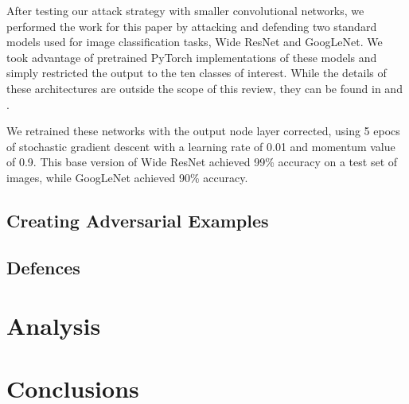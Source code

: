 \documentclass[conference]{IEEEtran}
\begin{document}
After testing our attack strategy with smaller convolutional networks, we
performed the work for this paper by attacking and defending two standard
models used for image classification tasks, Wide ResNet and GoogLeNet. We
took advantage of pretrained PyTorch implementations of these models and
simply restricted the output to the ten classes of interest. While the
details of these architectures are outside the scope of this review, they
can be found in \cite{zagoruyko2016wide} and \cite{szegedy2015going}.

We retrained these networks with the output node layer corrected, using 5
epocs of stochastic gradient descent with a learning rate of 0.01 and
momentum value of 0.9. This base version of Wide ResNet achieved 99\%
accuracy on a test set of images, while GoogLeNet achieved 90\% accuracy.

\subsection{Creating Adversarial Examples}

\subsection{Defences}

\section{Analysis}

\section{Conclusions}



\end{document}
